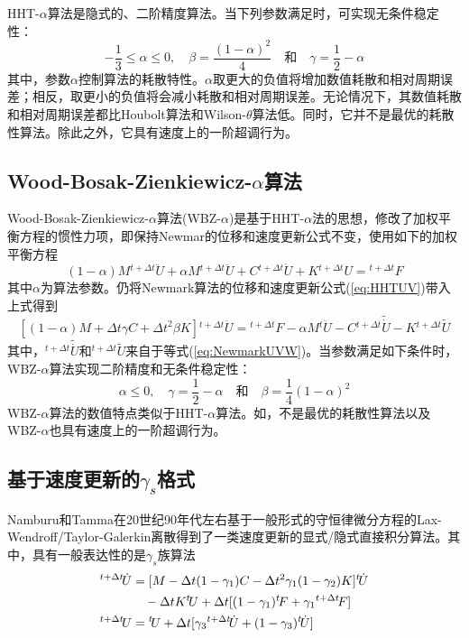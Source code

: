 HHT-$\alpha$算法是隐式的、二阶精度算法。当下列参数满足时，可实现无条件稳定性：
\begin{equation}
-\frac{1}{3}\le\alpha\le0,\quad\beta=\frac{(1-\alpha)^2}{4}\quad\text{和}\quad\gamma=\frac{1}{2}-\alpha
\end{equation}
其中，参数$\alpha$控制算法的耗散特性。$\alpha$取更大的负值将增加数值耗散和相对周期误差；相反，取更小的负值将会减小耗散和相对周期误差。无论情况下，其数值耗散和相对周期误差都比Houbolt算法和Wilson-$\theta$算法低。同时，它并不是最优的耗散性算法。除此之外，它具有速度上的一阶超调行为。
\subsection{Wood-Bosak-Zienkiewicz-$\alpha$算法}
Wood-Bosak-Zienkiewicz-$\alpha$算法(WBZ-$\alpha$)\cite{Wood1980b}是基于HHT-$\alpha$法的思想，修改了加权平衡方程的惯性力项，即保持Newmar的位移和速度更新公式不变，使用如下的加权平衡方程
\begin{equation}
(1-\alpha)M{^{t+\Delta t}\!\ddot{U}}+\alpha M{^{t+\Delta t}\!\ddot{U}}+C{^{t+\Delta t}\!\dot{U}}+K{^{t+\Delta t}\!U}={^{t+\Delta t}\!F}
\end{equation}
其中$\alpha$为算法参数。仍将Newmark算法的位移和速度更新公式(\ref{eq:HHTUV})带入上式得到
\begin{equation}
\left[(1-\alpha)M+\Delta t\gamma C+\Delta t^2\beta K\right]{^{t+\Delta t}\!\ddot{U}}={^{t+\Delta t}\!F}-\alpha M{^{t}\!\ddot{U}}-C{^{t+\Delta t}\!\widetilde{\dot{U}}}-K{^{t+\Delta t}\!\widetilde{U}}
\end{equation}
其中，${^{t+\Delta t}\!\widetilde{\dot{U}}}$和${^{t+\Delta t}\!\widetilde{U}}$来自于等式(\ref{eq:NewmarkUVW})。当参数满足如下条件时，WBZ-$\alpha$算法实现二阶精度和无条件稳定性：
\begin{equation}
\alpha\le0,\quad\gamma=\frac{1}{2}-\alpha\quad\text{和}\quad\beta=\frac{1}{4}(1-\alpha)^2
\end{equation}
WBZ-$\alpha$算法的数值特点类似于HHT-$\alpha$算法。如，不是最优的耗散性算法以及WBZ-$\alpha$也具有速度上的一阶超调行为。

\subsection{基于速度更新的$\gamma_s$格式}
Namburu和Tamma在20世纪90年代左右基于一般形式的守恒律微分方程的Lax-Wendroff/Taylor-Galerkin离散得到了一类速度更新的显式/隐式直接积分算法\cite{Tamma1988f,Tamma1988d,Tamma1989a,Tamma1990c,Tamma1990b,Tamma1992a,Namburu1992a}。其中，具有一般表达性的是$\gamma_s$族算法\cite{Namburu1992a}
\begin{align}
[M+\Delta t\gamma_1C+\Delta t^2\gamma_1\gamma_2K]{^{t+\Delta t}\!\dot{U}}&=[M-\Delta t(1-\gamma_1)C-\Delta t^2\gamma_1(1-\gamma_2)K]{^t\!\dot{U}}\notag\\
&\quad -\Delta tK{^t\!U}+\Delta t[(1-\gamma_1){^t\!F}+\gamma_1{^{t+\Delta t}\!F}]\\
{^{t+\Delta t}\!U}&={^t\!U}+\Delta t[\gamma_3{^{t+\Delta t}\!\dot{U}}+(1-\gamma_3){^t\!\dot{U}}]\label{eq:TammaU}
\end{align}

